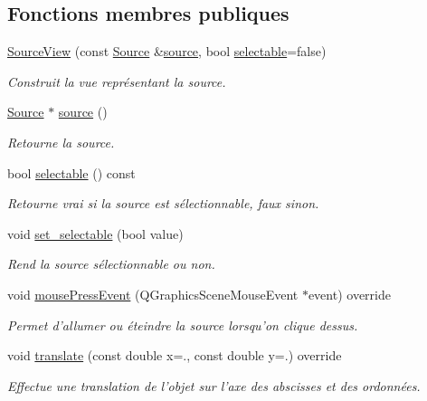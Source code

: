 \subsection*{Fonctions membres publiques}
\begin{DoxyCompactItemize}
\item 
\hyperlink{classSourceView_a978bb2492cf5379d407ee448f554dda6}{Source\+View} (const \hyperlink{classSource}{Source} \&\hyperlink{classSourceView_a39b5010fa2f3c764638d0c01eb97f616}{source}, bool \hyperlink{classSourceView_ab6c051d55846c3880a8f2672650327aa}{selectable}=false)
\begin{DoxyCompactList}\small\item\em Construit la vue représentant la source. \end{DoxyCompactList}\item 
\hyperlink{classSource}{Source} $\ast$ \hyperlink{classSourceView_a39b5010fa2f3c764638d0c01eb97f616}{source} ()
\begin{DoxyCompactList}\small\item\em Retourne la source. \end{DoxyCompactList}\item 
bool \hyperlink{classSourceView_ab6c051d55846c3880a8f2672650327aa}{selectable} () const 
\begin{DoxyCompactList}\small\item\em Retourne vrai si la source est sélectionnable, faux sinon. \end{DoxyCompactList}\item 
void \hyperlink{classSourceView_a64f81b9f42abf51e39b4b16fb8be3dff}{set\+\_\+selectable} (bool value)
\begin{DoxyCompactList}\small\item\em Rend la source sélectionnable ou non. \end{DoxyCompactList}\item 
void \hyperlink{classSourceView_a04947a9f3d8c575b61c03d869be66408}{mouse\+Press\+Event} (Q\+Graphics\+Scene\+Mouse\+Event $\ast$event) override
\begin{DoxyCompactList}\small\item\em Permet d’allumer ou éteindre la source lorsqu’on clique dessus. \end{DoxyCompactList}\item 
void \hyperlink{classSourceView_a96144eb5f08c6dc6b378fa604bb626a2}{translate} (const double x=., const double y=.) override
\begin{DoxyCompactList}\small\item\em Effectue une translation de l’objet sur l’axe des abscisses et des ordonnées. \end{DoxyCompactList}\item 

\end{DoxyCompactItemize}

